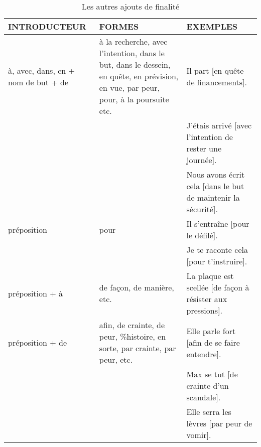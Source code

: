 \documentclass[UTF8]{report}
\begin{document}
\begin{table}[H]
    \centering
    \small
    \begin{tabular}{|p{3cm}|p{6cm}|p{6cm}|}
    \hline
    \rowcolor{cyan!20}
    \textbf{INTRODUCTEUR} & \textbf{FORMES} & \textbf{EXEMPLES} \\
    \hline
    à, avec, dans, en + nom de but + de & à la recherche, avec l'intention, dans le but, dans le dessein, en quête, en prévision, en vue, par peur, pour, à la poursuite etc. & Il part [en quête de financements]. \\
    & & J'étais arrivé [avec l'intention de rester une journée]. \\
    & & Nous avons écrit cela [dans le but de maintenir la sécurité]. \\
    \hline
    préposition & pour & Il s'entraîne [pour le défilé]. \\
    & & Je te raconte cela [pour t'instruire]. \\
    \hline
    préposition + à & de façon, de manière, etc. & La plaque est scellée [de façon à résister aux pressions]. \\
    \hline
    préposition + de & afin, de crainte, de peur, \%histoire, en sorte, par crainte, par peur, etc. & Elle parle fort [afin de se faire entendre]. \\
    & & Max se tut [de crainte d'un scandale]. \\
    & & Elle serra les lèvres [par peur de vomir]. \\
    \hline
    \end{tabular}
    \caption{Les autres ajouts de finalité}
\end{table}
\end{document}
